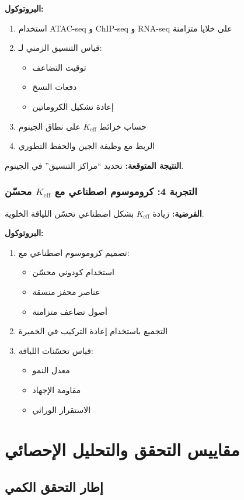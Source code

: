 \documentclass[11pt,a4paper]{article}
\begin{document}
	\textbf{البروتوكول:}
	\begin{enumerate}
		\item استخدام ATAC-seq و ChIP-seq و RNA-seq على خلايا متزامنة
		\item قياس التنسيق الزمني لـ:
		\begin{itemize}
			\item توقيت التضاعف
			\item دفعات النسخ
			\item إعادة تشكيل الكروماتين
		\end{itemize}
		\item حساب خرائط $K_{\text{eff}}$ على نطاق الجينوم
		\item الربط مع وظيفة الجين والحفظ التطوري
	\end{enumerate}
	
	\textbf{النتيجة المتوقعة:} تحديد ``مراكز التنسيق'' في الجينوم.
	
	\subsubsection{التجربة 4: كروموسوم اصطناعي مع $K_{\text{eff}}$ محسّن}
	\textbf{الفرضية:} زيادة $K_{\text{eff}}$ بشكل اصطناعي تحسّن اللياقة الخلوية.
	
	\textbf{البروتوكول:}
	\begin{enumerate}
		\item تصميم كروموسوم اصطناعي مع:
		\begin{itemize}
			\item استخدام كودوني محسّن
			\item عناصر محفز منسقة
			\item أصول تضاعف متزامنة
		\end{itemize}
		\item التجميع باستخدام إعادة التركيب في الخميرة
		\item قياس تحسّنات اللياقة:
		\begin{itemize}
			\item معدل النمو
			\item مقاومة الإجهاد
			\item الاستقرار الوراثي
		\end{itemize}
	\end{enumerate}
	
	\section{مقاييس التحقق والتحليل الإحصائي}
	
	\subsection{إطار التحقق الكمي}
	
\end{document}
